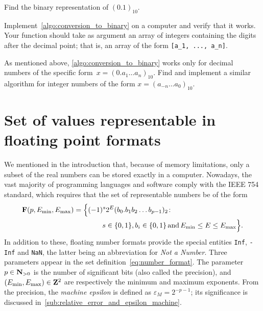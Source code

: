 \begin{exercise}
    \label{exercise:binary_zero_point_one}
    Find the binary representation of $(0.1)_{10}$.
\end{exercise}

\begin{exercise}
    Implement~\cref{algo:conversion_to_binary} on a computer and verify that it works.
    Your function should take as argument an array of integers containing the digits after the decimal point;
    that is, an array of the form \verb?[a_1, ..., a_n]?.
\end{exercise}

\begin{exercise}
    As mentioned above, \cref{algo:conversion_to_binary} works only for decimal numbers of the specific form~$x = (0.a_1\dots a_n)_{10}$.
    Find and implement a similar algorithm for integer numbers of the form $x = (a_{-n} \dots a_{0})_{10}$.
\end{exercise}

\section{Set of values representable in floating point formats}%
\label{sec:set_of_values}
We mentioned in the introduction that,
because of memory limitations,
only a subset of the real numbers can be stored exactly in a computer.
Nowadays, the vast majority of programming languages and software comply with the IEEE 754 standard,
which requires that the set of representable numbers be of the form
\begin{align}
    \notag
    \floating (p, E_{\min}, E_{\max})
    = \Bigl\{ & (-1)^s 2^E (b_0. b_1 b_2 \dots b_{p-1})_2 \colon \\
    \label{eq:number_format}%
              & \qquad s \in \{0, 1\}, b_i \in \{0, 1\} \, \text{and} \, E_{\min} \leq E \leq E_{\max} \Bigr\}.
\end{align}
In addition to these, floating number formats provide the special entities \texttt{Inf}, \texttt{-Inf} and \texttt{NaN},
the latter being an abbreviation for \emph{Not a Number}.
Three parameters appear in the set definition~\eqref{eq:number_format}.
The parameter $p \in \mathbf N_{>0}$ is the number of significant bits (also called the precision),
and $(E_{\min}, E_{\max}) \in \mathbf Z^2$ are respectively the minimum and maximum exponents.
From the precision, the \emph{machine epsilon} is defined as $\varepsilon_{M} = 2^{-p-1}$;
its significance is discussed in~\cref{sub:relative_error_and_epsilon_machine}.

